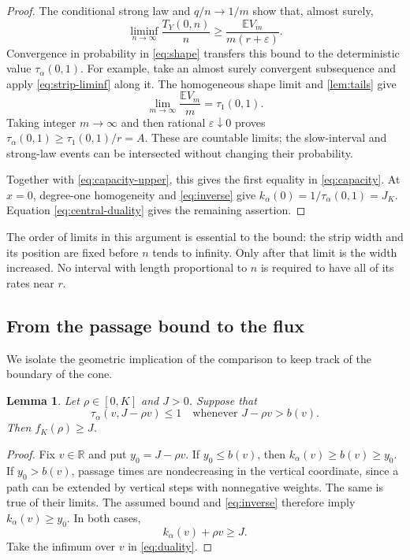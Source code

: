 \documentclass[11pt]{amsart}
\newtheorem{lemma}[theorem]{Lemma}
\theoremstyle{remark}
\newcommand{\EE}{\mathbb E}
\newcommand{\RR}{\mathbb R}
\numberwithin{equation}{section}
\begin{document}
\begin{proof}
The conditional strong law and $q/n\to1/m$ show that, almost surely,
\begin{equation}\label{eq:strip-liminf}
 \liminf_{n\to\infty}\frac{T_Y(0,n)}n
       \geq\frac{\EE V_m}{m(r+\varepsilon)}.
\end{equation}
Convergence in probability in \eqref{eq:shape} transfers this bound to
the deterministic value $\tau_\alpha(0,1)$. For example, take an
almost surely convergent subsequence and apply
\eqref{eq:strip-liminf} along it. The homogeneous shape limit and
\cref{lem:tails} give
\[
 \lim_{m\to\infty}\frac{\EE V_m}m=\tau_1(0,1).
\]
Taking integer $m\to\infty$ and then rational
$\varepsilon\downarrow0$ proves
$\tau_\alpha(0,1)\geq\tau_1(0,1)/r=A$.
These are countable limits; the slow-interval and strong-law events
can be intersected without changing their probability.

Together with \eqref{eq:capacity-upper}, this gives the first equality
in \eqref{eq:capacity}. At $x=0$, degree-one homogeneity and
\eqref{eq:inverse} give $k_\alpha(0)=1/\tau_\alpha(0,1)=J_K$.
Equation \eqref{eq:central-duality} gives the remaining assertion.
\end{proof}

The order of limits in this argument is essential to the bound: the
strip width and its position are fixed before $n$ tends to infinity.
Only after that limit is the width increased. No interval with length
proportional to $n$ is required to have all of its rates near $r$.

\subsection{From the passage bound to the flux}
We isolate the geometric implication of the comparison to keep track
of the boundary of the cone.

\begin{lemma}\label{lem:line}
Let $\rho\in[0,K]$ and $J>0$. Suppose that
\[
 \tau_\alpha(v,J-\rho v)\leq1
 \quad\text{whenever }J-\rho v>b(v).
\]
Then $f_K(\rho)\geq J$.
\end{lemma}

\begin{proof}
Fix $v\in\RR$ and put $y_0=J-\rho v$. If $y_0\leq b(v)$, then
$k_\alpha(v)\geq b(v)\geq y_0$. If $y_0>b(v)$, passage times are
nondecreasing in the vertical coordinate, since a path can be extended
by vertical steps with nonnegative weights. The same is true of their
limits. The assumed bound and \eqref{eq:inverse} therefore imply
$k_\alpha(v)\geq y_0$. In both cases,
\[
 k_\alpha(v)+\rho v\geq J.
\]
Take the infimum over $v$ in \eqref{eq:duality}.
\end{proof}
\end{document}

